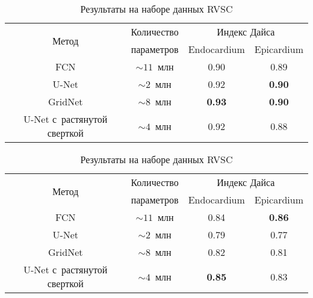 \begin{table}[h]
  \begin{center}
    \caption{Результаты на наборе данных LVSC} \label{tab:lvsc_results}
    \begin{tabular}{ |c||*{3}{c|} }
      \hline
      \multirow{2}{*}{Метод}      & Количество   & \multicolumn{2}{c|}{Индекс Дайса} \\ \cline{3-4}
                                  & параметров   & Endocardium   & Epicardium        \\ \hline
      \hline
      FCN                         & $\sim11$~млн & 0.90          & 0.89              \\ \hline
      U-Net                       &  $\sim2$~млн & 0.92          & \textbf{0.90}     \\ \hline
      GridNet                     &  $\sim8$~млн & \textbf{0.93} & \textbf{0.90}     \\ \hline
      U-Net с~растянутой сверткой &  $\sim4$~млн & 0.92          & 0.88              \\ 
      \hline
    \end{tabular}

    \vspace{0.6cm}
    
    \caption{Результаты на наборе данных RVSC} \label{tab:rvsc_results}
    \begin{tabular}{ |c||*{3}{c|} }
      \hline
      \multirow{2}{*}{Метод}      & Количество   & \multicolumn{2}{c|}{Индекс Дайса} \\ \cline{3-4}
                                  & параметров   & Endocardium   & Epicardium        \\ \hline
      \hline
      FCN                         & $\sim11$~млн & 0.84          & \textbf{0.86}     \\ \hline
      U-Net                       &  $\sim2$~млн & 0.79          & 0.77              \\ \hline
      GridNet                     &  $\sim8$~млн & 0.82          & 0.81              \\ \hline
      U-Net с~растянутой сверткой &  $\sim4$~млн & \textbf{0.85} & 0.83              \\ 
      \hline
    \end{tabular}

    \vspace{0.6cm}
    

\end{center}
\end{table}

